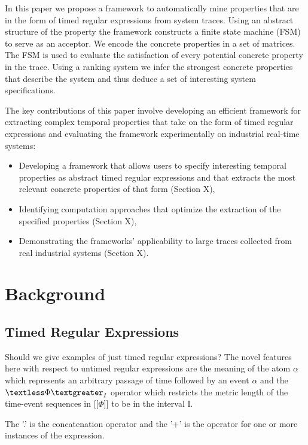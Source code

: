 \documentclass[]{sigplanconf}
\begin{document}
In this paper we propose a framework to automatically mine properties that are in the form of timed regular expressions from system traces. Using an abstract structure of the property the framework constructs a finite state machine (FSM) to serve as an acceptor. We encode the concrete properties in a set of matrices. The FSM is used to evaluate the satisfaction of every potential concrete property in the trace. Using a ranking system we infer the strongest concrete properties that describe the system and thus deduce a set of interesting system specifications. 

The key contributions of this paper involve developing an efficient framework for extracting complex temporal properties that take on the form of timed regular expressions and evaluating the framework experimentally on industrial real-time systems:

\begin{itemize}
\item Developing a framework that allows users to specify interesting temporal properties as abstract timed regular expressions and that extracts the most relevant concrete properties of that form (Section X),
\item Identifying computation approaches that optimize the extraction of the specified properties (Section X),
\item Demonstrating the frameworks' applicability to large traces collected from real industrial systems  (Section X).
\end{itemize}

\section{Background}
\subsection{Timed Regular Expressions}

Should we give examples of just timed regular expressions?
The novel features here with respect to untimed regular expressions are the meaning of the atom $\underline{\alpha}$ which represents an arbitrary passage of time followed by an event $\alpha$ and the $\textless \Phi \textgreater _I$ operator which restricts the metric length of the time-event sequences in [[$\Phi$]] to be in the interval I.

The '.' is the concatenation operator and the '+' is the operator for one or more instances of the expression.  
\end{document}
